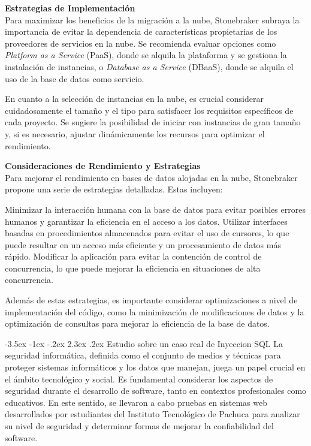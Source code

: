 \documentclass[11pt]{report}
\makeatletter
\renewcommand\chapter{\@startsection{chapter}{0}{\z@}%
    {-3.5ex \@plus -1ex \@minus -.2ex}%
    {2.3ex \@plus.2ex}%
    {\normalfont\Large\bfseries}}
\makeatother
\begin{document}
\textbf{Estrategias de Implementación} \\
Para maximizar los beneficios de la migración a la nube, Stonebraker subraya la importancia de evitar la dependencia de características propietarias de los proveedores
de servicios en la nube. Se recomienda evaluar opciones como \emph{Platform as a Service} (PaaS), donde se alquila la plataforma y se gestiona la instalación de instancias, o
\emph{Database as a Service} (DBaaS), donde se alquila el uso de la base de datos como servicio.

En cuanto a la selección de instancias en la nube, es crucial considerar cuidadosamente el tamaño y el tipo para satisfacer los requisitos específicos de cada proyecto. Se sugiere 
la posibilidad de iniciar con instancias de gran tamaño y, si es necesario, ajustar dinámicamente los recursos para optimizar el rendimiento.

\textbf{Consideraciones de Rendimiento y Estrategias} \\
Para mejorar el rendimiento en bases de datos alojadas en la nube, Stonebraker propone una serie de estrategias detalladas. Estas incluyen:

Minimizar la interacción humana con la base de datos para evitar posibles errores humanos y garantizar la eficiencia en el acceso a los datos.
Utilizar interfaces basadas en procedimientos almacenados para evitar el uso de cursores, lo que puede resultar en un acceso más eficiente y un procesamiento de datos más rápido.
Modificar la aplicación para evitar la contención de control de concurrencia, lo que puede mejorar la eficiencia en situaciones de alta concurrencia.

Además de estas estrategias, es importante considerar optimizaciones a nivel de implementación del código, como la minimización de modificaciones de datos y la optimización de consultas
para mejorar la eficiencia de la base de datos.

\cleardoublepage

\chapter{Estudio sobre un caso real de Inyeccion SQL} 
La seguridad informática, definida como el conjunto de medios y técnicas para proteger sistemas informáticos y los datos que manejan,
juega un papel crucial en el ámbito tecnológico y social. Es fundamental considerar los aspectos de seguridad durante el desarrollo
de software, tanto en contextos profesionales como educativos. En este sentido, se llevaron a cabo pruebas en sistemas web desarrollados
por estudiantes del Instituto Tecnológico de Pachuca para analizar su nivel de seguridad y determinar formas de mejorar la confiabilidad del software.
\end{document}
